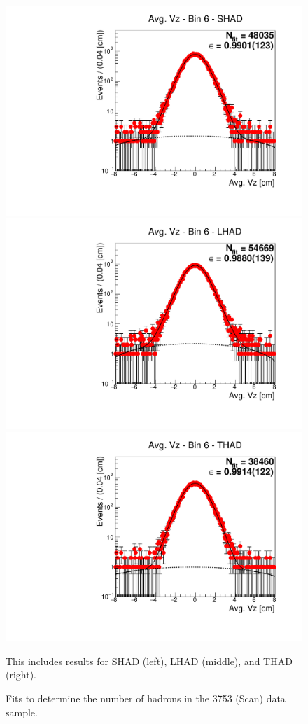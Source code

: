 \begin{figure}[H]
\centering
\includegraphics[scale=0.25]{figures/plots/nonDDbar_fit_results/scan/fit_scan_06_data_SHAD.pdf}
\hspace{-0.5cm}
\includegraphics[scale=0.25]{figures/plots/nonDDbar_fit_results/scan/fit_scan_06_data_LHAD.pdf}
\hspace{-0.5cm}
\includegraphics[scale=0.25]{figures/plots/nonDDbar_fit_results/scan/fit_scan_06_data_THAD.pdf}
\caption{Fits to determine the number of hadrons in the 3753 (Scan) data sample.}
{This includes results for SHAD (left), LHAD (middle), and THAD (right).}
\label{fig:hadron_fits_scan_06}
\end{figure}


